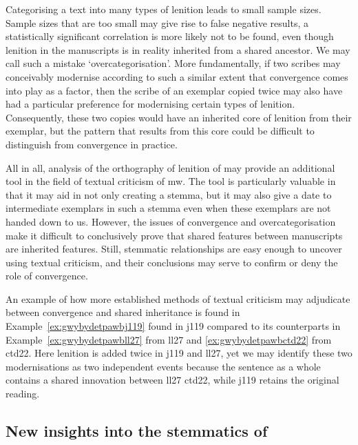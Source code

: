 Categorising a text into many types of lenition leads to small sample sizes. Sample sizes that are too small may give rise to false negative results, \ie a statistically significant correlation is more likely not to be found, even though lenition in the manuscripts is in reality inherited from a shared ancestor. We may call such a mistake `overcategorisation'. More fundamentally, if two scribes may conceivably modernise according to such a similar extent that convergence comes into play as a factor, then the scribe of an exemplar copied twice may also have had a particular preference for modernising certain types of lenition. Consequently, these two copies would have an inherited core of lenition from their exemplar, but the pattern that results from this core could be difficult to distinguish from convergence in practice.

All in all, analysis of the orthography of lenition of  may provide an additional tool in the field of textual criticism of \gls{mw}. The tool is particularly valuable in that it may aid in not only creating a stemma, but it may also give a date to intermediate exemplars in such a stemma even when these exemplars are not handed down to us. However, the issues of convergence and overcategorisation make it difficult to conclusively prove that shared features between manuscripts are inherited features. Still, stemmatic relationships are easy enough to uncover using textual criticism, and their conclusions may serve to confirm or deny the role of convergence.

An example of how more established methods of textual criticism may adjudicate between convergence and shared inheritance is  found in Example~\ref{ex:gwybydetpawbj119} found in \gls{j119} compared to its counterparts in Example~\ref{ex:gwybydetpawbll27} from \gls{ll27} and \ref{ex:gwybydetpawbctd22} from \gls{ctd22}. Here lenition is added twice in \gls{j119} and \gls{ll27}, yet we may identify these two modernisations as two independent events  because the sentence as a whole contains a shared innovation between \gls{ll27} \gls{ctd22}, while \gls{j119} retains the original reading. 

\subsection{New insights into the stemmatics of }
\label{sec:new-insights-into}

